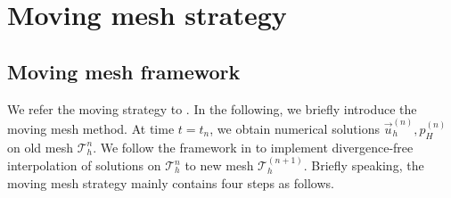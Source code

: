 \documentclass{eajam}
\begin{document}
\section{Moving mesh strategy}
  \subsection{Moving mesh framework}
     \label{sec4} We refer the moving strategy to
     \cite{di2005moving}. In the following, we briefly introduce the
     moving mesh method. At time $t = t_{n}$, we obtain  numerical
     solutions $\vec{u}_h^{(n)}, p_H^{(n)}$ on old 
     mesh $\mathcal{T}_h^n$. We follow the framework in
     \cite{di2005moving} to implement divergence-free 
     interpolation of solutions on $\mathcal{T}_h^n$ to new mesh
     $\mathcal{T}_h^{(n + 1)}$. Briefly speaking, the moving mesh
     strategy mainly contains four steps as follows.
\end{document}

